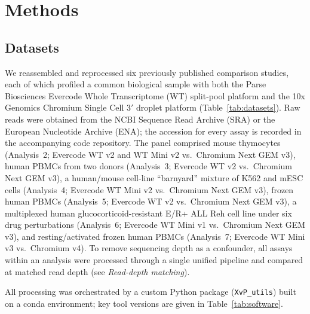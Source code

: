 \section{Methods}

\subsection{Datasets}

We reassembled and reprocessed six previously published comparison studies, each of
which profiled a common biological sample with both the Parse Biosciences Evercode
Whole Transcriptome (WT) split-pool platform and the 10x Genomics Chromium Single
Cell 3$'$ droplet platform (Table~\ref{tab:datasets}). Raw reads were obtained from
the NCBI Sequence Read Archive (SRA) or the European Nucleotide Archive (ENA); the
accession for every assay is recorded in the accompanying code repository. The panel
comprised mouse thymocytes (Analysis~2;
Evercode WT v2 and WT Mini v2 vs.\ Chromium Next GEM v3), human PBMCs from two donors
(Analysis~3; Evercode WT v2 vs.\ Chromium Next GEM v3), a human/mouse cell-line
``barnyard'' mixture of K562 and mESC cells (Analysis~4; Evercode WT Mini v2 vs.\
Chromium Next GEM v3), frozen human PBMCs (Analysis~5; Evercode WT v2 vs.\ Chromium
Next GEM v3), a multiplexed human glucocorticoid-resistant E/R+ ALL Reh cell line
under six drug perturbations (Analysis~6; Evercode WT Mini v1 vs.\ Chromium Next GEM
v3), and resting/activated frozen human PBMCs (Analysis~7; Evercode WT Mini v3 vs.\
Chromium v4). To remove sequencing depth as a confounder, all assays within an
analysis were processed through a single unified pipeline and compared at matched
read depth (see \textit{Read-depth matching}).

All processing was orchestrated by a custom Python package (\texttt{XvP\_utils})
built on a conda environment; key tool versions are given in Table~\ref{tab:software}.

